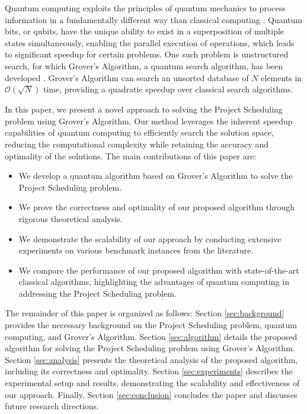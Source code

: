 Quantum computing exploits the principles of quantum mechanics to process information in a fundamentally different way than classical computing \cite{nielsen2010quantum}. Quantum bits, or qubits, have the unique ability to exist in a superposition of multiple states simultaneously, enabling the parallel execution of operations, which leads to significant speedup for certain problems. One such problem is unstructured search, for which Grover's Algorithm, a quantum search algorithm, has been developed \cite{grover1996fast}. Grover's Algorithm can search an unsorted database of $N$ elements in $\mathcal{O}(\sqrt{N})$ time, providing a quadratic speedup over classical search algorithms.

In this paper, we present a novel approach to solving the Project Scheduling problem using Grover's Algorithm. Our method leverages the inherent speedup capabilities of quantum computing to efficiently search the solution space, reducing the computational complexity while retaining the accuracy and optimality of the solutions. The main contributions of this paper are:

\begin{itemize}
    \item We develop a quantum algorithm based on Grover's Algorithm to solve the Project Scheduling problem.
    \item We prove the correctness and optimality of our proposed algorithm through rigorous theoretical analysis.
    \item We demonstrate the scalability of our approach by conducting extensive experiments on various benchmark instances from the literature.
    \item We compare the performance of our proposed algorithm with state-of-the-art classical algorithms, highlighting the advantages of quantum computing in addressing the Project Scheduling problem.
\end{itemize}

The remainder of this paper is organized as follows: Section \ref{sec:background} provides the necessary background on the Project Scheduling problem, quantum computing, and Grover's Algorithm. Section \ref{sec:algorithm} details the proposed algorithm for solving the Project Scheduling problem using Grover's Algorithm. Section \ref{sec:analysis} presents the theoretical analysis of the proposed algorithm, including its correctness and optimality. Section \ref{sec:experiments} describes the experimental setup and results, demonstrating the scalability and effectiveness of our approach. Finally, Section \ref{sec:conclusion} concludes the paper and discusses future research directions.

